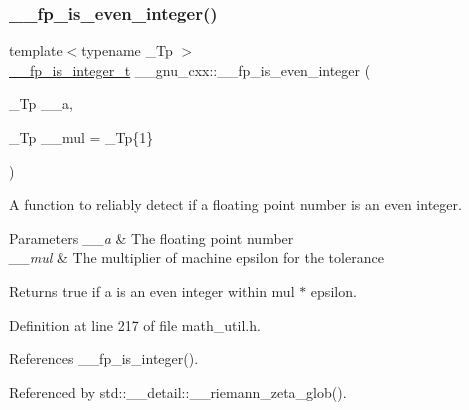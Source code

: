 \mbox{\label{namespace____gnu__cxx_aa78dac4c2812a060d30efa5a3c99977c}} 
\subsubsection{\texorpdfstring{\+\_\+\+\_\+fp\+\_\+is\+\_\+even\+\_\+integer()}{\_\_fp\_is\_even\_integer()}}
{\footnotesize\ttfamily template$<$typename \+\_\+\+Tp $>$ \\
\hyperlink{struct____gnu__cxx_1_1____fp__is__integer__t}{\+\_\+\+\_\+fp\+\_\+is\+\_\+integer\+\_\+t} \+\_\+\+\_\+gnu\+\_\+cxx\+::\+\_\+\+\_\+fp\+\_\+is\+\_\+even\+\_\+integer (\begin{DoxyParamCaption}\item[{\+\_\+\+Tp}]{\+\_\+\+\_\+a,  }\item[{\+\_\+\+Tp}]{\+\_\+\+\_\+mul = {\ttfamily \+\_\+Tp\{1\}} }\end{DoxyParamCaption})\hspace{0.3cm}{\ttfamily [inline]}}

A function to reliably detect if a floating point number is an even integer.


\begin{DoxyParams}{Parameters}
{\em \+\_\+\+\_\+a} & The floating point number \\
\hline
{\em \+\_\+\+\_\+mul} & The multiplier of machine epsilon for the tolerance \\
\hline
\end{DoxyParams}
\begin{DoxyReturn}{Returns}
{\ttfamily true} if a is an even integer within mul $\ast$ epsilon. 
\end{DoxyReturn}


Definition at line 217 of file math\+\_\+util.\+h.



References \+\_\+\+\_\+fp\+\_\+is\+\_\+integer().



Referenced by std\+::\+\_\+\+\_\+detail\+::\+\_\+\+\_\+riemann\+\_\+zeta\+\_\+glob().

\mbox{\label{namespace____gnu__cxx_a5b5e889240854b8a4452ac49593fdc74}} 

